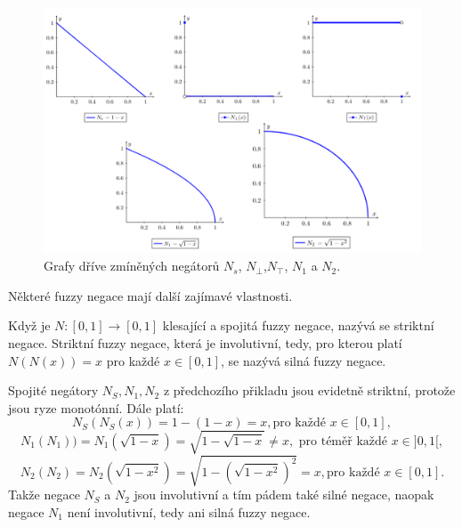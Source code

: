\begin{example}
            \begin{figure}[H]
            \caption{ Grafy dříve zmíněných negátorů $N_s$, $N_{\bot}$,$ N_{\top}$, $N_1$ a $N_2.$\\}
                \includegraphics[scale=0.60]{template-fig/negace.pdf}
                \centering
            \end{figure}

    \end{example}

   N\v ekter\'e fuzzy negace maj\'i dal\v s\'i zaj\'imav\'e vlastnosti. 

    \begin{definition}
    \cite{Kolo}
        Kdy\v z je $N: [0,1] \to [0,1]$ klesající a spojitá fuzzy negace, nazývá se striktní negace.
        Striktn\'i fuzzy negace, kter\'a je involutivní, tedy, pro kterou plat\'i $N(N(x)) = x $ pro každé $ x \in [0,1]$, se nazývá silná fuzzy negace.
    \end{definition}

    \begin{example}
        Spojit\'e neg\'atory $N_S, N_1, N_2$ z p\v redchoz\'iho p\v rikladu jsou evidetn\v e striktn\'i, proto\v ze jsou ryze monot\'onn\'i. D\'ale plat\'i:
        $$N_S(N_S(x))=1-(1-x)=x, \mbox{pro ka\v zd\'e } x \in [0,1],$$
                $$N_1(N_1)) = N_1(\sqrt{1-x}) = \sqrt{1-\sqrt{1-x}} \neq x, \mbox{ pro t\'em\v e\v r každé } x \in ]0,1[,$$ $$N_2(N_2) = N_2(\sqrt{1-x^2}) = \sqrt{1-(\sqrt{1-x^2})^2} = x,
                \mbox{pro každé } x \in [0,1].$$
Takže negace $N_S$ a $N_2$ jsou involutivní a tím pádem tak\'e siln\'e negace, naopak
            negace $N_1$ není involutivní, tedy ani siln\'a fuzzy negace.
                
            \end{example}

